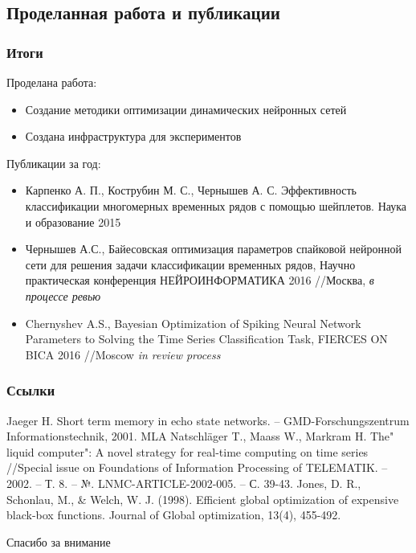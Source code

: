 \documentclass{beamer}
\begin{document}
\subsection{Проделанная работа и публикации}
\begin{frame}
\frametitle{Итоги}
Проделана работа:
\begin{itemize}
\item Создание методики оптимизации динамических нейронных сетей
\item Создана инфраструктура для экспериментов
\end{itemize}
Публикации за год:
\begin{itemize}
\item {\scriptsize Карпенко А. П., Кострубин М. С., Чернышев А. С. Эффективность классификации многомерных временных рядов с помощью шейплетов. Наука и образование 2015 }
\item {\scriptsize Чернышев А.С., Байесовская оптимизация параметров спайковой нейронной сети для решения задачи классификации временных рядов,  Научно практическая конференция НЕЙРОИНФОРМАТИКА 2016 //Москва, \textit{в процессе ревью} } 
\item {\scriptsize  Chernyshev A.S., Bayesian Optimization of Spiking Neural
Network Parameters to Solving the Time Series
Classification Task, FIERCES ON BICA 2016 //Moscow \textit{in review process} }
\end{itemize}
\end{frame}



\begin{frame}
\frametitle{Ссылки}
\footnotesize{
\begin{thebibliography}{99} %
 Jaeger H. Short term memory in echo state networks. – GMD-Forschungszentrum Informationstechnik, 2001.
MLA	
 Natschläger T., Maass W., Markram H. The" liquid computer": A novel strategy for real-time computing on time series //Special issue on Foundations of Information Processing of TELEMATIK. – 2002. – Т. 8. – №. LNMC-ARTICLE-2002-005. – С. 39-43.
 Jones, D. R., Schonlau, M., \& Welch, W. J. (1998). Efficient global optimization of expensive black-box functions. Journal of Global optimization, 13(4), 455-492.

\end{thebibliography}
}
\end{frame}


\begin{frame}
\Huge{\centerline{Спасибо за внимание}}
\end{frame}

\end{document}
